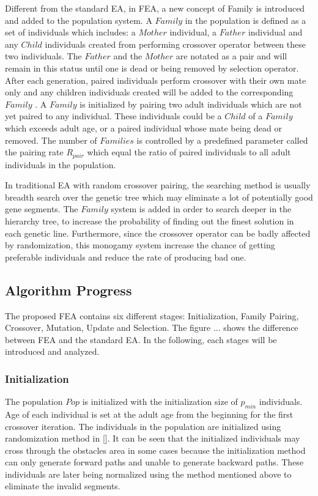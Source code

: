 \documentclass[final]{elsarticle}
\begin{document}
Different from the standard EA, in FEA, a new concept of Family is introduced and added to the population system. A $ Family $ in the population is defined as a set of individuals which includes: a $ Mother $ individual, a $ Father $ individual and any $ Child $ individuals created from performing crossover operator between these two individuals. The $ Father $ and the $ Mother $ are notated as a pair and will remain in this status until one is dead or being removed by selection operator. After each generation, paired individuals perform crossover with their own mate only and any children individuals created will be added to the corresponding $ Family $ . A $ Family $ is initialized by pairing two adult individuals which are not yet paired to any individual. These individuals could be a $ Child $ of a $ Family $ which exceeds adult age, or a paired individual whose mate being dead or removed. The number of $ Families $ is controlled by a predefined parameter called the pairing rate $R_{pair}$ which equal the ratio of paired individuals to all adult individuals in the population.

In traditional EA with random crossover pairing, the searching method is usually breadth search over the genetic tree which may eliminate a lot of potentially good gene segments. The $ Family $ system is added in order to search deeper in the hierarchy tree, to increase the probability of finding out the finest solution in each genetic line. Furthermore, since the crossover operator can be badly affected by randomization, this monogamy system increase the chance of getting preferable individuals and reduce the rate of producing bad one. 


\subsection{Algorithm Progress}

The proposed FEA contains six different stages: Initialization, Family Pairing, Crossover, Mutation, Update and Selection. The figure ... shows the difference between FEA and the standard EA. In the following, each stages will be introduced and analyzed.

\subsubsection{Initialization}

The population $Pop$ is initialized with the initialization size of $p_{min}$ individuals. Age of each individual is set at the adult age from the beginning for the first crossover iteration. The individuals in the population are initialized using randomization method in []. It can be seen that the initialized individuals may cross through the obstacles area in some cases because the initialization method can only generate forward paths and unable to generate backward paths. These individuals are later being normalized using the method mentioned above to eliminate the invalid segments.
\end{document}
